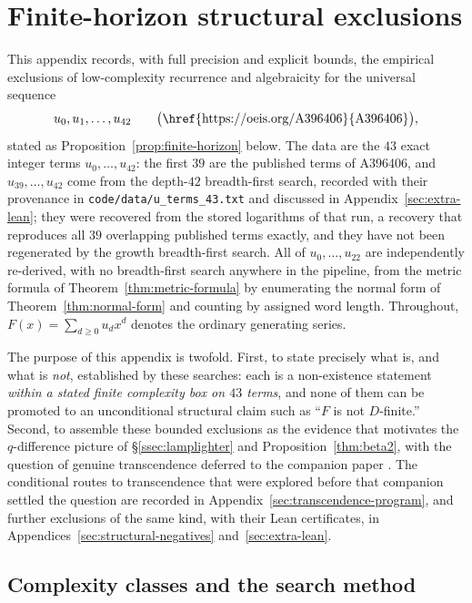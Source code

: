 \documentclass[11pt]{article}
\theoremstyle{plain}
\theoremstyle{definition}
\theoremstyle{remark}
\begin{document}
\appendix

\section{Finite-horizon structural exclusions}
\label{sec:finite-horizon-exclusions}

This appendix records, with full precision and explicit bounds, the
empirical exclusions of low-complexity recurrence and algebraicity for the
universal sequence
\[
  u_0, u_1, \ldots, u_{42}
  \qquad\bigl(\text{\href{https://oeis.org/A396406}{A396406}}\bigr),
\]
stated as Proposition~\ref{prop:finite-horizon} below.
The data are the $43$ exact integer terms $u_0,\ldots,u_{42}$: the first
$39$ are the published terms of A396406, and $u_{39},\ldots,u_{42}$ come
from the depth-$42$ breadth-first search, recorded with their provenance
in \texttt{code/data/u\_terms\_43.txt} and discussed in
Appendix~\ref{sec:extra-lean}; they were recovered from the stored
logarithms of that run, a recovery that reproduces all $39$ overlapping
published terms exactly, and they have not been regenerated by the growth
breadth-first search. All of $u_0,\ldots,u_{22}$
are independently re-derived, with no breadth-first search anywhere in the
pipeline, from the metric formula of Theorem~\ref{thm:metric-formula} by
enumerating the normal form of Theorem~\ref{thm:normal-form} and counting
by assigned word length. Throughout, $F(x) = \sum_{d\ge 0} u_d x^d$ denotes
the ordinary generating series.

The purpose of this appendix is twofold. First, to state precisely what is,
and what is \emph{not}, established by these searches: each is a
non-existence statement \emph{within a stated finite complexity box on
$43$ terms}, and none of them can be promoted to an unconditional
structural claim such as ``$F$ is not $D$-finite.'' Second, to assemble
these bounded exclusions as the evidence that motivates the
$q$-difference picture of \S\ref{ssec:lamplighter} and
Proposition~\ref{thm:beta2}, with the question of genuine transcendence
deferred to the companion paper \cite{Bonfioli2026b}. The conditional routes
to transcendence that were explored before that companion settled the
question are recorded in Appendix~\ref{sec:transcendence-program}, and
further exclusions of the same kind, with their Lean certificates, in
Appendices~\ref{sec:structural-negatives} and~\ref{sec:extra-lean}.

\subsection*{Complexity classes and the search method}
\end{document}

